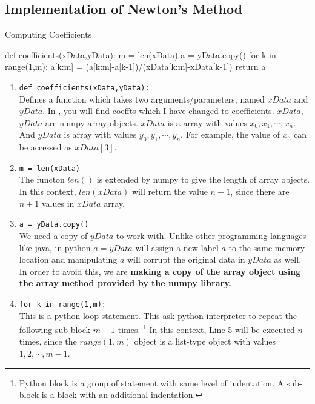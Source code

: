 \subsection{Implementation of Newton's Method}

\begin{program}Computing Coefficients
	\begin{python}
		def coefficients(xData,yData):
			m = len(xData)
			a = yData.copy()
			for k in range(1,m):
				a[k:m] = (a[k:m]-a[k-1])/(xData[k:m]-xData[k-1])
			return a
	\end{python}
\end{program}
\begin{commentary}
\begin{enumerate}[label=Line \arabic*]
	\item \texttt{def coefficients(xData,yData):} \\
		Defines a function which takes two arguments/parameters, named $xData$ and $yData$.
		In \cite[3.2]{kiusalaas}, you will find coeffts which I have changed to coefficients.
		$xData$,$yData$ are numpy array objects.
		$xData$ is a array with values $x_0,x_1,\cdots,x_n$.
		And $yData$ is array with values $y_0,y_1,\cdots,y_n$.
		For example, the value of $x_3$ can be accessed as $xData[3]$.
	\item \texttt{m = len(xData)}\\
		The functon $len()$ is extended by numpy to give the length of array objects.
		In this context, $len(xData)$ will return the value $n+1$, since there are $n+1$ values in $xData$ array.
	\item \texttt{a = yData.copy()}\\
		We need a copy of $yData$ to work with.
		Unlike other programming languages like java, in python $a = yData$ will assign a new label $a$ to the same memory location and manipulating $a$ will corrupt the original data in $yData$ as well.
		In order to avoid this, we are \textbf{making a copy of the array object using the array method provided by the numpy library.}
	\item \texttt{for k in range(1,m):}\\
		This is a python loop statement.
		This ask python interpreter to repeat the following sub-block $m-1$ times.
		\footnote{
			Python block is a group of statement with same level of indentation.
			A sub-block is a block with an additional indentation.
		}
		In this context, Line 5 will be executed $n$ times, since the $range(1,m)$ object is a list-type object with values $1,2,\cdots,m-1$.

\end{enumerate}
\end{commentary}
